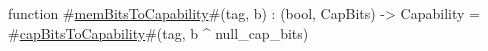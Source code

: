 function #\hyperref[sailRISCVzmemBitsToCapability]{memBitsToCapability}#(tag, b) : (bool, CapBits) -> Capability =
  #\hyperref[sailRISCVzcapBitsToCapability]{capBitsToCapability}#(tag, b ^ null_cap_bits)
